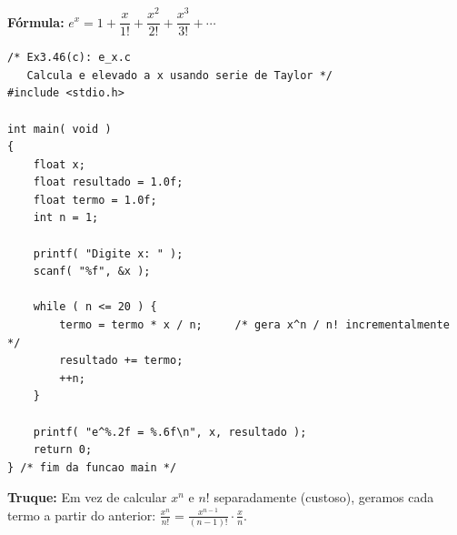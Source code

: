 \documentclass[12pt,a4paper]{article}
\begin{document}
\begin{respostabox}
\textbf{Fórmula:} $e^x = 1 + \dfrac{x}{1!} + \dfrac{x^2}{2!} + \dfrac{x^3}{3!} + \cdots$

\begin{lstlisting}
/* Ex3.46(c): e_x.c
   Calcula e elevado a x usando serie de Taylor */
#include <stdio.h>

int main( void )
{
    float x;
    float resultado = 1.0f;
    float termo = 1.0f;
    int n = 1;

    printf( "Digite x: " );
    scanf( "%f", &x );

    while ( n <= 20 ) {
        termo = termo * x / n;     /* gera x^n / n! incrementalmente */
        resultado += termo;
        ++n;
    }

    printf( "e^%.2f = %.6f\n", x, resultado );
    return 0;
} /* fim da funcao main */
\end{lstlisting}

\textbf{Truque:} Em vez de calcular $x^n$ e $n!$ separadamente (custoso), geramos cada
termo a partir do anterior: $\frac{x^n}{n!} = \frac{x^{n-1}}{(n-1)!} \cdot \frac{x}{n}$.
\end{respostabox}
\end{document}
